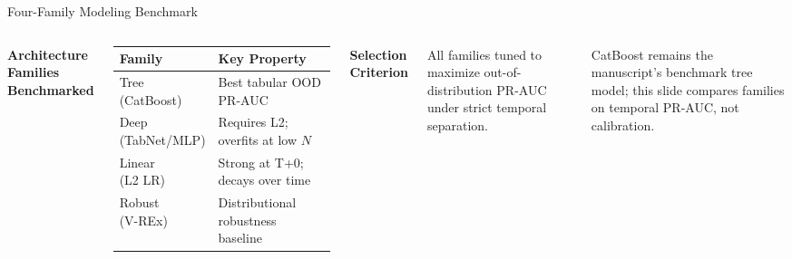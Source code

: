 \documentclass[10pt, aspectratio=169]{beamer}
\begin{document}
\begin{frame}{Four-Family Modeling Benchmark}
 \begin{columns}
 \textbf{Architecture Families Benchmarked}

 \vspace{0.5em}
 \footnotesize
 \begin{tabular}{p{1.9cm} p{4.1cm}}
 \toprule
 \textbf{Family} & \textbf{Key Property} \\
 \midrule
 \shortstack[l]{Tree\\(CatBoost)} & Best tabular OOD PR-AUC \\[0.4em]
 \shortstack[l]{Deep\\(TabNet/MLP)} & Requires L2; overfits at low $N$ \\[0.4em]
 \shortstack[l]{Linear\\(L2 LR)} & Strong at T+0; decays over time \\[0.4em]
 \shortstack[l]{Robust\\(V-REx)} & Distributional robustness baseline \\
 \bottomrule
 \end{tabular}

 \textbf{Selection Criterion}
 \vspace{0.5em}

 All families tuned to maximize out-of-distribution PR-AUC under strict temporal separation.

 \vspace{0.8em}
 CatBoost remains the manuscript's benchmark tree model; this slide compares families on temporal PR-AUC, not calibration.
 \end{columns}
\end{frame}
\end{document}

